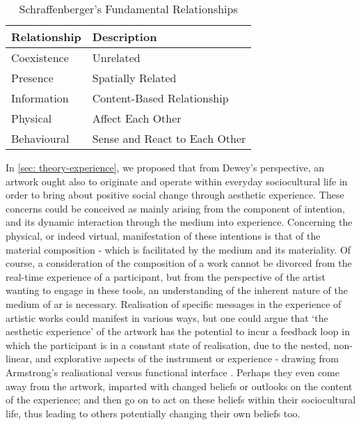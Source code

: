\begin{table}
    \centering
    \begin{tabular}{ l l }
        \toprule
        Relationship        & Description                       \\
        \midrule
        Coexistence         & Unrelated                         \\
        Presence            & Spatially Related                 \\
        Information         & Content-Based Relationship        \\
        Physical            & Affect Each Other                 \\
        Behavioural         & Sense and React to Each Other     \\
        \bottomrule
    \end{tabular}
    \caption{Schraffenberger's Fundamental Relationships}\label{table:schraffenbergertaxonomy2}
\end{table}
In \autoref{sec: theory-experience}, we proposed that from Dewey's perspective, an artwork ought also to originate and operate within everyday sociocultural life in order to bring about positive social change through aesthetic experience. These concerns could be conceived as mainly arising from the component of intention, and its dynamic interaction through the medium into experience. Concerning the physical, or indeed virtual, manifestation of these intentions is that of the material composition - which is facilitated by the medium and its materiality. Of course, a consideration of the composition of a work cannot be divorced from the real-time experience of a participant, but from the perspective of the artist wanting to engage in these tools, an understanding of the inherent nature of the medium of \gls{ar} is necessary. Realisation of specific messages in the experience of artistic works could manifest in various ways, but one could argue that `the aesthetic experience' of the artwork has the potential to incur a feedback loop in which the participant is in a constant state of realisation, due to the nested, non-linear, and explorative aspects of the instrument or experience - drawing from Armstrong's realisational versus functional interface \citeyearpar{armstrong2006}. Perhaps they even come away from the artwork, imparted with changed beliefs or outlooks on the content of the experience; and then go on to act on these beliefs within their sociocultural life, thus leading to others potentially changing their own beliefs too.

